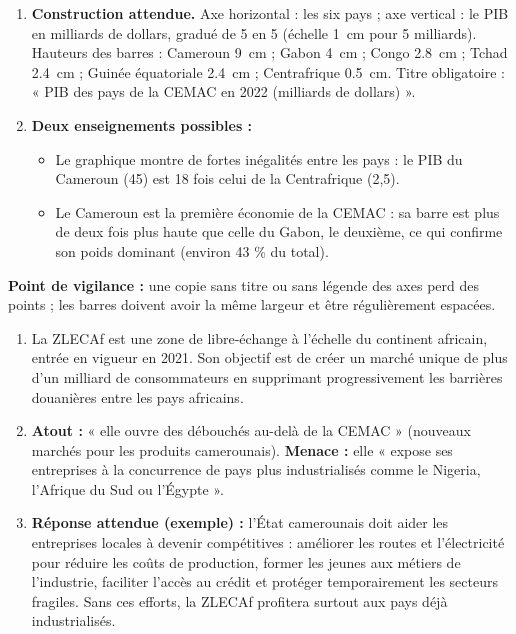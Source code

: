 \documentclass[11pt]{article}
\begin{document}
\begin{corrige}
\begin{enumerate}
\item \textbf{Construction attendue.} Axe horizontal : les six pays ; axe vertical : le PIB en milliards de dollars, gradué de 5 en 5 (échelle \SI{1}{cm} pour 5 milliards). Hauteurs des barres : Cameroun \SI{9}{cm} ; Gabon \SI{4}{cm} ; Congo \SI{2,8}{cm} ; Tchad \SI{2,4}{cm} ; Guinée équatoriale \SI{2,4}{cm} ; Centrafrique \SI{0,5}{cm}. Titre obligatoire : « PIB des pays de la CEMAC en 2022 (milliards de dollars) ».
\item \textbf{Deux enseignements possibles :}
\begin{itemize}
\item Le graphique montre de fortes inégalités entre les pays : le PIB du Cameroun (45) est 18 fois celui de la Centrafrique (2,5).
\item Le Cameroun est la première économie de la CEMAC : sa barre est plus de deux fois plus haute que celle du Gabon, le deuxième, ce qui confirme son poids dominant (environ 43 \% du total).
\end{itemize}
\end{enumerate}
\textbf{Point de vigilance :} une copie sans titre ou sans légende des axes perd des points ; les barres doivent avoir la même largeur et être régulièrement espacées.
\end{corrige}

\begin{corrige}
\begin{enumerate}
\item La ZLECAf est une zone de libre-échange à l'échelle du continent africain, entrée en vigueur en 2021. Son objectif est de créer un marché unique de plus d'un milliard de consommateurs en supprimant progressivement les barrières douanières entre les pays africains.
\item \textbf{Atout :} « elle ouvre des débouchés au-delà de la CEMAC » (nouveaux marchés pour les produits camerounais). \textbf{Menace :} elle « expose ses entreprises à la concurrence de pays plus industrialisés comme le Nigeria, l'Afrique du Sud ou l'Égypte ».
\item \textbf{Réponse attendue (exemple) :} l'État camerounais doit aider les entreprises locales à devenir compétitives : améliorer les routes et l'électricité pour réduire les coûts de production, former les jeunes aux métiers de l'industrie, faciliter l'accès au crédit et protéger temporairement les secteurs fragiles. Sans ces efforts, la ZLECAf profitera surtout aux pays déjà industrialisés.
\end{enumerate}
\end{corrige}
\end{document}
